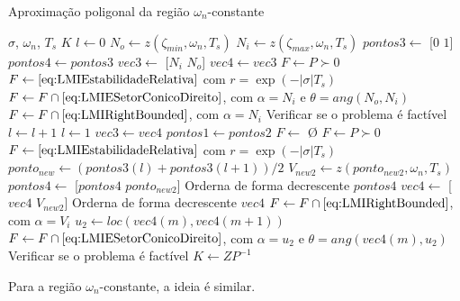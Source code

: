 \begin{algorithm}[ht!]
  \caption{Aproximação poligonal da região $\omega_n$-constante}\label{alg:AproximacaoPoligonalWn}
  \begin{algorithmic}[1]
    \Require $\sigma$, $\omega_n$, $T_s$
    \Ensure $K$
    \State $l \gets 0$
    \State $N_o \gets z(\zeta_{min},\omega_n,T_s)$
    \State $N_i \gets z(\zeta_{max},\omega_n,T_s)$
    \State $pontos3 \gets$ [$0$ $1$]
    \State $pontos4 \gets pontos3$
    \State $vec3 \gets$ [$N_i$ $N_o$]
    \State $vec4 \gets vec3$
    \State $F \gets P \succ 0$
    \State $F \gets \eqref{eq:LMIEstabilidadeRelativa}$ com $r = \exp{\left(-|\sigma|T_s\right)}$ 
    \State $F \gets F \cap \eqref{eq:LMIESetorConicoDireito}$, com $\alpha = N_i$ e $\theta = ang(N_o,N_i)$ 
    \State $F \gets F \cap \eqref{eq:LMIRightBounded}$, com $\alpha = N_i$ 
    \State Verificar se o problema é factível
        \State $l \gets l + 1$
      \Else
        \State $l \gets 1$
        \State $vec3 \gets vec4$
        \State $pontos1 \gets pontos2$
      \EndIf
        \State $F \gets$ \O {}
        \State $F \gets P \succ 0$
        \State $F \gets \eqref{eq:LMIEstabilidadeRelativa}$ com $r = \exp{\left(-|\sigma|T_s\right)}$ 
        \State $ponto_{new} \gets (pontos3(l)+pontos3(l+1))/2$
        \State $V_{new2} \gets z(ponto_{new2}, \omega_n, T_s)$
        \State $pontos4 \gets$ [$pontos4$ $ponto_{new2}$]
        \State Orderna de forma decrescente $pontos4$
        \State $vec4 \gets$ [$vec4$ $V_{new2}$]
        \State Orderna de forma decrescente $vec4$
        \State $F \gets F \cap \eqref{eq:LMIRightBounded}$, com $\alpha = V_i$ 
          \State $u_2 \gets loc(vec4(m),vec4(m+1))$
          \State $F \gets F \cap \eqref{eq:LMIESetorConicoDireito}$, com $\alpha = u_2$ e $\theta = ang(vec4(m),u_2)$
        \EndFor
        \State Verificar se o problema é factível
    \EndWhile
    \State $K \gets ZP^{-1}$
  \end{algorithmic}
\end{algorithm}

Para a região $\omega_n$-constante, a ideia é similar.
